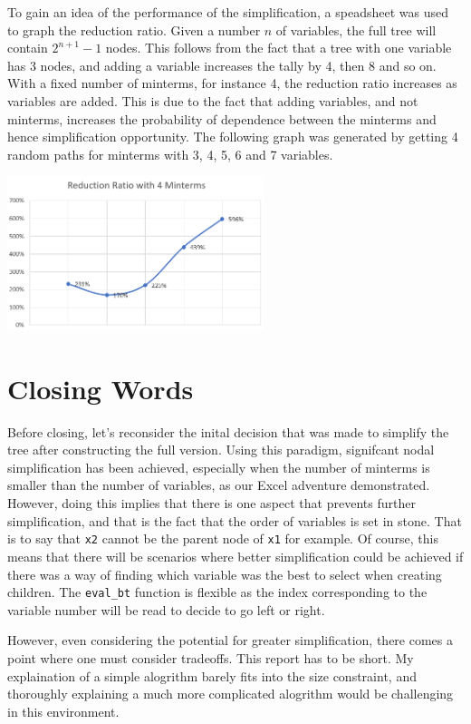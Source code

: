 \documentclass[12pt]{article}
\begin{document}
    To gain an idea of the performance of the simplification, a speadsheet was used to graph the reduction ratio. Given a number $n$ of variables, the full tree will contain $2^{n+1}-1$ nodes. This follows from the fact that a tree with one variable has 3 nodes, and adding a variable increases the tally by 4, then 8 and so on. With a fixed number of minterms, for instance 4, the reduction ratio increases as variables are added. This is due to the fact that adding variables, and not minterms, increases the probability of dependence between the minterms and hence simplification opportunity. The following graph was generated by getting 4 random paths for minterms with 3, 4, 5, 6 and 7 variables.
    \begin{center} \vspace{-3ex}
        \includegraphics[width=7.5cm, interpolate]{rsc/stats.png}
        \parbox{\linewidth}{}
    \end{center}

    \section{Closing Words}
    Before closing, let's reconsider the inital decision that was made to simplify the tree after constructing the full version. Using this paradigm, signifcant nodal simplification has been achieved, especially when the number of minterms is smaller than the number of variables, as our Excel adventure demonstrated. However, doing this implies that there is one aspect that prevents further simplification, and that is the fact that the order of variables is set in stone. That is to say that \texttt{x2} cannot be the parent node of \texttt{x1} for example. Of course, this means that there will be scenarios where better simplification could be achieved if there was a way of finding which variable was the best to select when creating children. The \texttt{eval\_bt} function is flexible as the index corresponding to the variable number will be read to decide to go left or right.

    However, even considering the potential for greater simplification, there comes a point where one must consider tradeoffs. This report has to be short. My explaination of a simple alogrithm barely fits into the size constraint, and thoroughly explaining a much more complicated alogrithm would be challenging in this environment.
\end{document}

